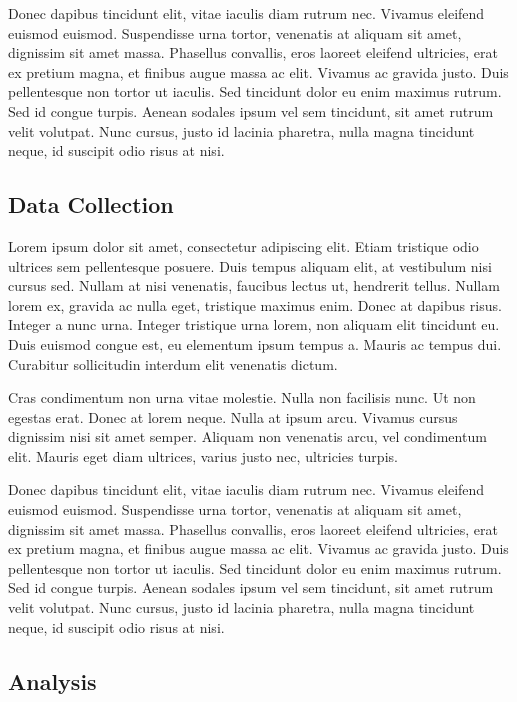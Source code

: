 \documentclass[11pt, a4paper]{resources/JTH}
\begin{document}
Donec dapibus tincidunt elit, vitae iaculis diam rutrum nec. Vivamus eleifend euismod euismod. Suspendisse urna tortor, venenatis at aliquam sit amet, dignissim sit amet massa. Phasellus convallis, eros laoreet eleifend ultricies, erat ex pretium magna, et finibus augue massa ac elit. Vivamus ac gravida justo. Duis pellentesque non tortor ut iaculis. Sed tincidunt dolor eu enim maximus rutrum. Sed id congue turpis. Aenean sodales ipsum vel sem tincidunt, sit amet rutrum velit volutpat. Nunc cursus, justo id lacinia pharetra, nulla magna tincidunt neque, id suscipit odio risus at nisi.

\subsection{Data Collection}

Lorem ipsum dolor sit amet, consectetur adipiscing elit. Etiam tristique odio ultrices sem pellentesque posuere. Duis tempus aliquam elit, at vestibulum nisi cursus sed. Nullam at nisi venenatis, faucibus lectus ut, hendrerit tellus. Nullam lorem ex, gravida ac nulla eget, tristique maximus enim. Donec at dapibus risus. Integer a nunc urna. Integer tristique urna lorem, non aliquam elit tincidunt eu. Duis euismod congue est, eu elementum ipsum tempus a. Mauris ac tempus dui. Curabitur sollicitudin interdum elit venenatis dictum.

Cras condimentum non urna vitae molestie. Nulla non facilisis nunc. Ut non egestas erat. Donec at lorem neque. Nulla at ipsum arcu. Vivamus cursus dignissim nisi sit amet semper. Aliquam non venenatis arcu, vel condimentum elit. Mauris eget diam ultrices, varius justo nec, ultricies turpis.

Donec dapibus tincidunt elit, vitae iaculis diam rutrum nec. Vivamus eleifend euismod euismod. Suspendisse urna tortor, venenatis at aliquam sit amet, dignissim sit amet massa. Phasellus convallis, eros laoreet eleifend ultricies, erat ex pretium magna, et finibus augue massa ac elit. Vivamus ac gravida justo. Duis pellentesque non tortor ut iaculis. Sed tincidunt dolor eu enim maximus rutrum. Sed id congue turpis. Aenean sodales ipsum vel sem tincidunt, sit amet rutrum velit volutpat. Nunc cursus, justo id lacinia pharetra, nulla magna tincidunt neque, id suscipit odio risus at nisi.

\subsection{Analysis}
\end{document}
